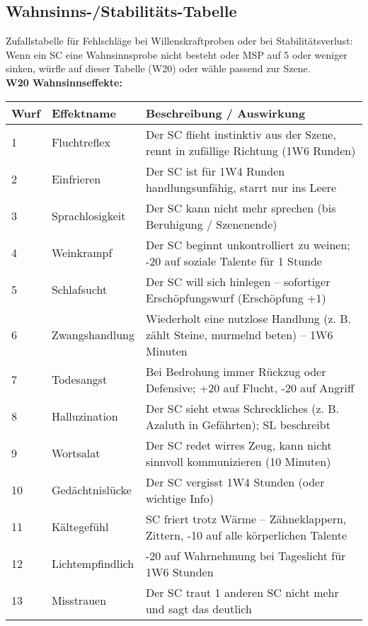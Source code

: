 \subsection{Wahnsinns-/Stabilitäts-Tabelle}
Zufallstabelle für Fehlschläge bei Willenskraftproben oder bei Stabilitätsverlust:\\
Wenn ein SC eine Wahnsinnsprobe nicht besteht oder MSP auf 5 oder weniger sinken, würfle auf dieser Tabelle (W20) oder wähle passend zur Szene.\\
\textbf{W20 Wahnsinnseffekte:}
\begin{small}
\begin{center}
\begin{tabular}{lll}
\toprule
\textbf{Wurf} & \textbf{Effektname} & \textbf{Beschreibung / Auswirkung} \\ 
\midrule 
1 & Fluchtreflex & Der SC flieht instinktiv aus der Szene, rennt in zufällige Richtung (1W6 Runden) \\ 
\midrule 
2 & Einfrieren & Der SC ist für 1W4 Runden handlungsunfähig, starrt nur ins Leere \\ 
\midrule 
3 & Sprachlosigkeit & Der SC kann nicht mehr sprechen (bis Beruhigung / Szenenende) \\ 
\midrule 
4 & Weinkrampf & Der SC beginnt unkontrolliert zu weinen; -20 auf soziale Talente für 1 Stunde \\ 
\midrule 
5 & Schlafsucht & Der SC will sich hinlegen – sofortiger Erschöpfungswurf (Erschöpfung +1) \\ 
\midrule 
6 & Zwangshandlung & Wiederholt eine nutzlose Handlung (z. B. zählt Steine, murmelnd beten) – 1W6 Minuten \\ 
\midrule 
7 & Todesangst & Bei Bedrohung immer Rückzug oder Defensive; +20 auf Flucht, -20 auf Angriff \\ 
\midrule 
8 & Halluzination & Der SC sieht etwas Schreckliches (z. B. Azaluth in Gefährten); SL beschreibt \\ 
\midrule 
9 & Wortsalat & Der SC redet wirres Zeug, kann nicht sinnvoll kommunizieren (10 Minuten) \\ 
\midrule 
10 & Gedächtnislücke & Der SC vergisst 1W4 Stunden (oder wichtige Info) \\ 
\midrule 
11 & Kältegefühl & SC friert trotz Wärme – Zähneklappern, Zittern, -10 auf alle körperlichen Talente \\ 
\midrule 
12 & Lichtempfindlich & -20 auf Wahrnehmung bei Tageslicht für 1W6 Stunden \\ 
\midrule 
13 & Misstrauen & Der SC traut 1 anderen SC nicht mehr und sagt das deutlich \\ 

\end{tabular}
\end{center}
\end{small}
